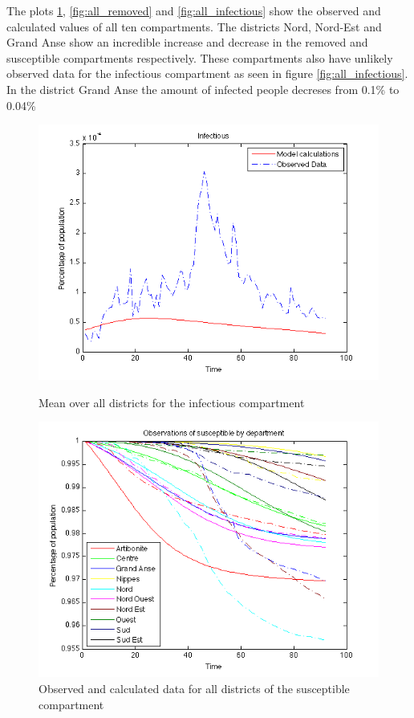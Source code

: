 \documentclass[11pt]{article}
\begin{document}
The plots \ref{fig:all_susceptible}, \ref{fig:all_removed} and \ref{fig:all_infectious} show the observed and calculated values of all ten compartments. The districts Nord, Nord-Est and Grand Anse show an incredible increase and decrease in the removed and susceptible compartments respectively. These compartments also have unlikely observed data for the infectious compartment as seen in figure \ref{fig:all_infectious}. In the district Grand Anse the amount of infected people decreses from  0.1\% to 0.04\% 



 



\begin{figure}[htb]
  \begin{minipage}[t]{0.49\textwidth}
    \centering
    \includegraphics[width=\textwidth]{Bilder/infectious_mean.png} 
    \caption{Mean over all districts for the infectious compartment}
	\label{fig:mean_infectious}
  \end{minipage}
  \hspace{0.02\textwidth}
  \begin{minipage}[t]{0.49\textwidth}
    \centering
    \includegraphics[width=\textwidth]{Bilder/susceptible.png} 
    \caption{Observed and calculated data for all districts of the susceptible compartment}
	\label{fig:all_susceptible}
  \end{minipage}
  

\end{figure}
\end{document}
